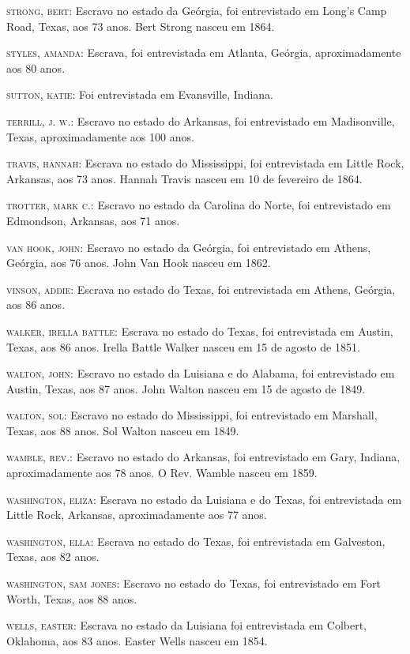 \begin{Parskip}
\textsc{strong, bert:} Escravo no estado da Geórgia, foi entrevistado em
Long's Camp Road, Texas, aos 73 anos. Bert Strong nasceu em 1864.

\textsc{styles, amanda:} Escrava, foi entrevistada em Atlanta, Geórgia,
aproximadamente aos 80 anos.

\textsc{sutton, katie:} Foi entrevistada em Evansville, Indiana.

\textsc{terrill, j. w.:} Escravo no estado do Arkansas, foi entrevistado
em Madisonville, Texas, aproximadamente aos 100 anos.

\textsc{travis, hannah:} Escrava no estado do Mississippi, foi
entrevistada em Little Rock, Arkansas, aos 73 anos. Hannah Travis nasceu
em 10 de fevereiro de 1864.

\textsc{trotter, mark c.:} Escravo no estado da Carolina do Norte, foi
entrevistado em Edmondson, Arkansas, aos 71 anos.

\textsc{van hook, john:} Escravo no estado da Geórgia, foi entrevistado
em Athens, Geórgia, aos 76 anos. John Van Hook nasceu em 1862.

\textsc{vinson, addie:} Escrava no estado do Texas, foi entrevistada em
Athens, Geórgia, aos 86 anos.

\textsc{walker, irella battle:} Escrava no estado do Texas, foi
entrevistada em Austin, Texas, aos 86 anos. Irella Battle Walker nasceu
em 15 de agosto de 1851.

\textsc{walton, john:} Escravo no estado da Luisiana e do Alabama, foi
entrevistado em Austin, Texas, aos 87 anos. John Walton nasceu em 15 de
agosto de 1849.

\textsc{walton, sol:} Escravo no estado do Mississippi, foi entrevistado
em Marshall, Texas, aos 88 anos. Sol Walton nasceu em 1849.

\textsc{wamble, rev.:} Escravo no estado do Arkansas, foi entrevistado
em Gary, Indiana, aproximadamente aos 78 anos. O Rev. Wamble nasceu em
1859.

\textsc{washington, eliza:} Escrava no estado da Luisiana e do Texas,
foi entrevistada em Little Rock, Arkansas, aproximadamente aos 77 anos.

\textsc{washington, ella:} Escrava no estado do Texas, foi entrevistada
em Galveston, Texas, aos 82 anos.

\textsc{washington, sam jones:} Escravo no estado do Texas, foi
entrevistado em Fort Worth, Texas, aos 88 anos.

\textsc{wells, easter:} Escrava no estado da Luisiana foi entrevistada
em Colbert, Oklahoma, aos 83 anos. Easter Wells nasceu em 1854.


\end{Parskip}
